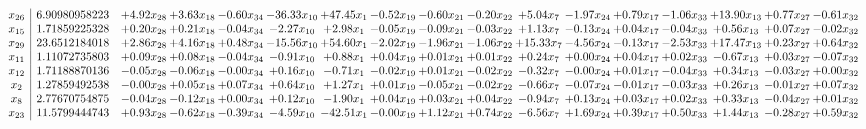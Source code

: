 \documentclass[9pt]{article}
\begin{document}
 \[\begin{array}{c| c c@{\hskip 2pt} c@{\hskip 2pt} c@{\hskip 2pt} c@{\hskip 2pt} c@{\hskip 2pt} c@{\hskip 2pt} c@{\hskip 2pt} c@{\hskip 2pt} c@{\hskip 2pt} c@{\hskip 2pt} c@{\hskip 2pt} c@{\hskip 2pt} c@{\hskip 2pt} c@{\hskip 2pt} c@{\hskip 2pt} }
 x_{26}   &  6.90980958223 & +  4.92 x_{28} & +  3.63 x_{18} & -0.60 x_{34} & -36.33 x_{10} & + 47.45 x_{1} & -0.52 x_{19} & -0.60 x_{21} & -0.20 x_{22} & +  5.04 x_{7} & -1.97 x_{24} & +  0.79 x_{17} & -1.06 x_{33} & + 13.90 x_{13} & +  0.77 x_{27} & -0.61 x_{32}\\
 x_{15}   &  1.71859225328 & +  0.20 x_{28} & +  0.21 x_{18} & -0.04 x_{34} & -2.27 x_{10} & +  2.98 x_{1} & -0.05 x_{19} & -0.09 x_{21} & -0.03 x_{22} & +  1.13 x_{7} & -0.13 x_{24} & +  0.04 x_{17} & -0.04 x_{33} & +  0.56 x_{13} & +  0.07 x_{27} & -0.02 x_{32}\\
 x_{29}   &  23.6512184018 & +  2.86 x_{28} & +  4.16 x_{18} & +  0.48 x_{34} & -15.56 x_{10} & + 54.60 x_{1} & -2.02 x_{19} & -1.96 x_{21} & -1.06 x_{22} & + 15.33 x_{7} & -4.56 x_{24} & -0.13 x_{17} & -2.53 x_{33} & + 17.47 x_{13} & +  0.23 x_{27} & +  0.64 x_{32}\\
 x_{11}   &  1.11072735803 & +  0.09 x_{28} & +  0.08 x_{18} & -0.04 x_{34} & -0.91 x_{10} & +  0.88 x_{1} & +  0.04 x_{19} & +  0.01 x_{21} & +  0.01 x_{22} & +  0.24 x_{7} & +  0.00 x_{24} & +  0.04 x_{17} & +  0.02 x_{33} & -0.67 x_{13} & +  0.03 x_{27} & -0.07 x_{32}\\
 x_{12}   &  1.71188870136 & -0.05 x_{28} & -0.06 x_{18} & -0.00 x_{34} & +  0.16 x_{10} & -0.71 x_{1} & -0.02 x_{19} & +  0.01 x_{21} & -0.02 x_{22} & -0.32 x_{7} & -0.00 x_{24} & +  0.01 x_{17} & -0.04 x_{33} & +  0.34 x_{13} & -0.03 x_{27} & +  0.00 x_{32}\\
 x_{2}   &  1.27859492538 & -0.00 x_{28} & +  0.05 x_{18} & +  0.07 x_{34} & +  0.64 x_{10} & +  1.27 x_{1} & +  0.01 x_{19} & -0.05 x_{21} & -0.02 x_{22} & -0.66 x_{7} & -0.07 x_{24} & -0.01 x_{17} & -0.03 x_{33} & +  0.26 x_{13} & -0.01 x_{27} & +  0.07 x_{32}\\
 x_{8}   &  2.77670754875 & -0.04 x_{28} & -0.12 x_{18} & +  0.00 x_{34} & +  0.12 x_{10} & -1.90 x_{1} & +  0.04 x_{19} & +  0.03 x_{21} & +  0.04 x_{22} & -0.94 x_{7} & +  0.13 x_{24} & +  0.03 x_{17} & +  0.02 x_{33} & +  0.33 x_{13} & -0.04 x_{27} & +  0.01 x_{32}\\
 x_{23}   &  11.5799444743 & +  0.93 x_{28} & -0.62 x_{18} & -0.39 x_{34} & -4.59 x_{10} & -42.51 x_{1} & -0.00 x_{19} & +  1.12 x_{21} & +  0.74 x_{22} & -6.56 x_{7} & +  1.69 x_{24} & +  0.39 x_{17} & +  0.50 x_{33} & +  1.44 x_{13} & -0.28 x_{27} & +  0.59 x_{32}\\

\end{array}\]
\end{document}
